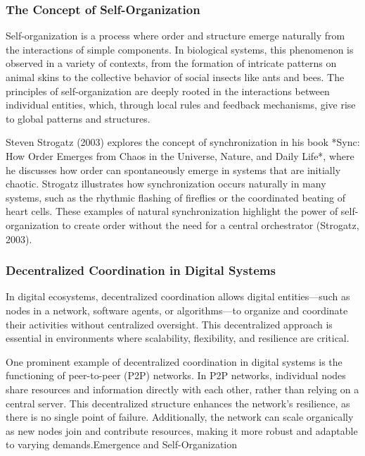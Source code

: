 \documentclass[12pt,twoside]{article}
\begin{document}
\subsubsection{The Concept of Self-Organization}

Self-organization is a process where order and structure emerge naturally from the interactions of simple components. In biological systems, this phenomenon is observed in a variety of contexts, from the formation of intricate patterns on animal skins to the collective behavior of social insects like ants and bees. The principles of self-organization are deeply rooted in the interactions between individual entities, which, through local rules and feedback mechanisms, give rise to global patterns and structures.

Steven Strogatz (2003) explores the concept of synchronization in his book *Sync: How Order Emerges from Chaos in the Universe, Nature, and Daily Life*, where he discusses how order can spontaneously emerge in systems that are initially chaotic. Strogatz illustrates how synchronization occurs naturally in many systems, such as the rhythmic flashing of fireflies or the coordinated beating of heart cells. These examples of natural synchronization highlight the power of self-organization to create order without the need for a central orchestrator (Strogatz, 2003).

\subsubsection{Decentralized Coordination in Digital Systems}

In digital ecosystems, decentralized coordination allows digital entities—such as nodes in a network, software agents, or algorithms—to organize and coordinate their activities without centralized oversight. This decentralized approach is essential in environments where scalability, flexibility, and resilience are critical.

One prominent example of decentralized coordination in digital systems is the functioning of peer-to-peer (P2P) networks. In P2P networks, individual nodes share resources and information directly with each other, rather than relying on a central server. This decentralized structure enhances the network's resilience, as there is no single point of failure. Additionally, the network can scale organically as new nodes join and contribute resources, making it more robust and adaptable to varying demands.Emergence and Self-Organization
\end{document}
